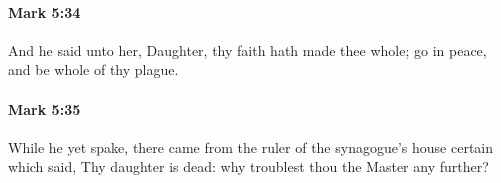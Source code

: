 		\paragraph{Mark 5:34} %
			\label{MARK-5-34}

			And he said unto her, Daughter, thy faith hath made thee whole; go in peace, and be whole of thy plague.

			\begin{framed}
			\scriptsize
				\begin{compactdesc}
					\item[SBLG] 
				\end{compactdesc}
			\end{framed}

		\paragraph{Mark 5:35} %
			\label{MARK-5-35}

			While he yet spake, there came from the ruler of the synagogue's house certain which said, Thy daughter is dead: why troublest thou the Master any further?

